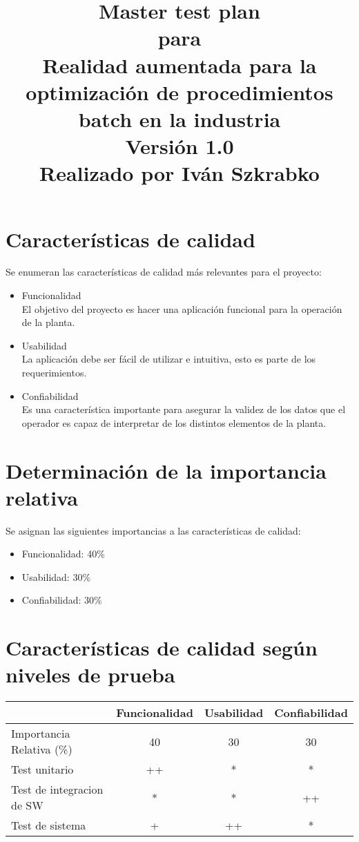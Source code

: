 \documentclass[]{scrreprt}
\title{
\flushleft
\Huge{Master test plan}\\
\vspace{1cm}
para\\
\vspace{1cm}
Realidad aumentada para la optimización de procedimientos batch en la industria\\
\vspace{1cm}
\LARGE{Versión 1.0\\}
\vspace{1cm}
Realizado por Iván Szkrabko\\
}
\begin{document}
\maketitle
\tableofcontents
\chapter{Características de calidad}
Se enumeran las características de calidad más relevantes para el proyecto:

\begin{itemize}
	\item Funcionalidad
	\\ El objetivo del proyecto es hacer una aplicación funcional para la operación de la planta.
	\item Usabilidad
	\\ La aplicación debe ser fácil de utilizar e intuitiva, esto es parte de los requerimientos.
	\item Confiabilidad
	\\ Es una característica importante para asegurar la validez de los datos que el operador es capaz de 				interpretar de los distintos elementos de la planta.
\end{itemize}
\chapter{Determinación de la importancia relativa}
Se asignan las siguientes importancias a las características de calidad:
\begin{itemize}
	\item Funcionalidad: 40\%
	\item Usabilidad:    30\%
	\item Confiabilidad: 30\%
\end{itemize}
\chapter{Características de calidad según niveles de prueba}
\begin{table}[h]
\begin{tabular}{|l|c|c|c|}
\hline
& \multicolumn{1}{l|}{Funcionalidad} & \multicolumn{1}{l|}{Usabilidad} & \multicolumn{1}{l|}{Confiabilidad} \\ \hline
Importancia Relativa (\%) & 40                                 & 30                              & 30                                 \\ \hline
Test unitario             & ++                                 &   *                             & * \\ \hline
Test de integracion de SW &   *                                &  *                              & ++                                 \\ \hline
Test de sistema           & +                                  & ++                              & * \\ \hline
\end{tabular}
\end{table}
\end{document}
